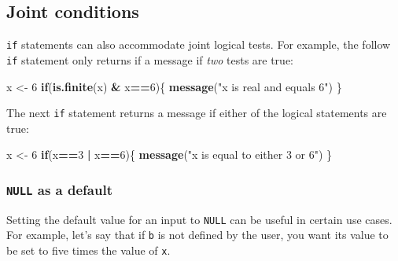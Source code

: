 \documentclass[]{book}
\newenvironment{Shaded}{\begin{snugshade}}{\end{snugshade}}
\newcommand{\ControlFlowTok}[1]{\textcolor[rgb]{0.13,0.29,0.53}{\textbf{#1}}}
\newcommand{\DecValTok}[1]{\textcolor[rgb]{0.00,0.00,0.81}{#1}}
\newcommand{\KeywordTok}[1]{\textcolor[rgb]{0.13,0.29,0.53}{\textbf{#1}}}
\newcommand{\NormalTok}[1]{#1}
\newcommand{\OperatorTok}[1]{\textcolor[rgb]{0.81,0.36,0.00}{\textbf{#1}}}
\newcommand{\StringTok}[1]{\textcolor[rgb]{0.31,0.60,0.02}{#1}}
\begin{document}
\hypertarget{joint-conditions}{%
\subsection*{Joint conditions}\label{joint-conditions}}

\texttt{if} statements can also accommodate joint logical tests. For example, the follow \texttt{if} statement only returns if a message if \emph{two} tests are true:

\begin{Shaded}
\begin{Highlighting}[]
\NormalTok{x <-}\StringTok{ }\DecValTok{6}
\ControlFlowTok{if}\NormalTok{(}\KeywordTok{is.finite}\NormalTok{(x) }\OperatorTok{&}\StringTok{ }\NormalTok{x}\OperatorTok{==}\DecValTok{6}\NormalTok{)\{}
  \KeywordTok{message}\NormalTok{(}\StringTok{"x is real and equals 6"}\NormalTok{)}
\NormalTok{\}}
\end{Highlighting}
\end{Shaded}

The next \texttt{if} statement returns a message if either of the logical statements are true:

\begin{Shaded}
\begin{Highlighting}[]
\NormalTok{x <-}\StringTok{ }\DecValTok{6}
\ControlFlowTok{if}\NormalTok{(x}\OperatorTok{==}\DecValTok{3} \OperatorTok{|}\StringTok{ }\NormalTok{x}\OperatorTok{==}\DecValTok{6}\NormalTok{)\{}
  \KeywordTok{message}\NormalTok{(}\StringTok{"x is equal to either 3 or 6"}\NormalTok{)}
\NormalTok{\}}
\end{Highlighting}
\end{Shaded}

\hypertarget{null-as-a-default}{%
\subsubsection*{\texorpdfstring{\texttt{NULL} as a default}{NULL as a default}}\label{null-as-a-default}}

Setting the default value for an input to \texttt{NULL} can be useful in certain use cases. For example, let's say that if \texttt{b} is not defined by the user, you want its value to be set to five times the value of \texttt{x}.
\end{document}
